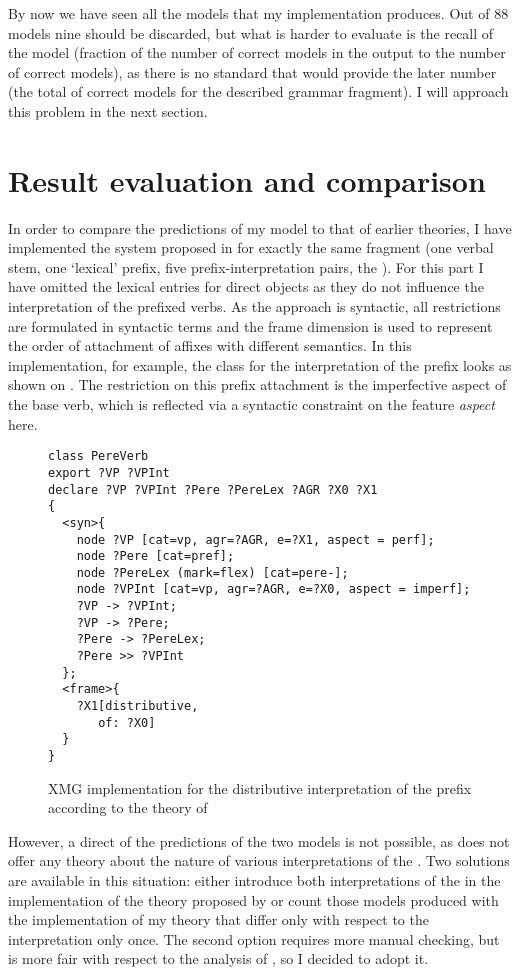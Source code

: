 By now we have seen all the models that my implementation produces. Out of 88 models nine should be discarded, but what is harder to evaluate is the recall of the model (fraction of the number of correct models in the output to the number of correct models), as there is no standard that would provide the later number (the total of correct models for the described grammar fragment). I will approach this problem in the next section.

\section{Result evaluation and comparison}
In order to compare the predictions of my model to that of earlier theories, I have implemented the system proposed in \citet{Tatevosov:09} for exactly the same fragment (one verbal stem, one `lexical' prefix, five prefix-interpretation pairs, the ). For this part I have omitted the lexical entries for direct objects as they do not influence the interpretation of the prefixed verbs. As the approach is syntactic, all restrictions are formulated in syntactic terms and the frame dimension is used to represent the order of attachment of affixes with different semantics. In this implementation, for example, the class for the  interpretation of the prefix  looks as shown on . The restriction on this prefix attachment is the imperfective aspect of the base verb, which is reflected via a syntactic constraint on the feature \textit{aspect} here.

\begin{figure}
\begin{lstlisting}[style=xmg]
class PereVerb
export ?VP ?VPInt 
declare ?VP ?VPInt ?Pere ?PereLex ?AGR ?X0 ?X1 
{
  <syn>{
    node ?VP [cat=vp, agr=?AGR, e=?X1, aspect = perf];
    node ?Pere [cat=pref];
    node ?PereLex (mark=flex) [cat=pere-];
    node ?VPInt [cat=vp, agr=?AGR, e=?X0, aspect = imperf];
    ?VP -> ?VPInt;
    ?VP -> ?Pere;
    ?Pere -> ?PereLex;
    ?Pere >> ?VPInt
  };
  <frame>{
    ?X1[distributive,
       of: ?X0]
  }
}
\end{lstlisting}
\caption{XMG implementation for the distributive interpretation of the prefix  according to the theory of \citet{Tatevosov:09}\label{xmg:Tat:pere}}
\end{figure}

However, a direct  of the predictions of the two models is not possible, as \citet{Tatevosov:09} does not offer any theory about the nature of various interpretations of the . Two solutions are available in this situation: either introduce both interpretations of the  in the implementation of the theory proposed by \citet{Tatevosov:09} or count those models produced with the implementation of my theory that differ only with respect to the interpretation only once. The second option requires more manual checking, but is more fair with respect to the analysis of \citet{Tatevosov:09}, so I decided to adopt it.

